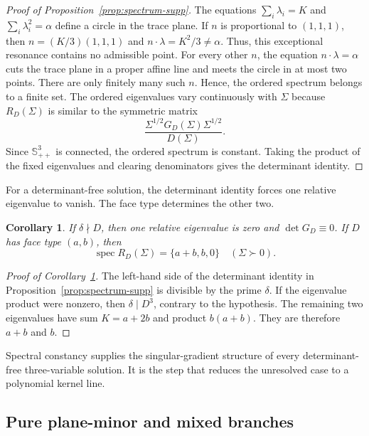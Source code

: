\documentclass[12pt,a4paper]{article}
\theoremstyle{plain}
\newtheorem{corollary}{Corollary}
\theoremstyle{definition}
\newcommand{\Smat}{\mathbb{S}}
\newcommand{\spec}{\operatorname{spec}}
\begin{document}
\begin{proof}[Proof of Proposition~\ref{prop:spectrum-supp}]
    The equations $\sum_i\lambda_i=K$ and $\sum_i\lambda_i^2=\alpha$ define a circle in the trace plane.
    If $n$ is proportional to $(1,1,1)$, then $n=(K/3)(1,1,1)$ and $n\cdot\lambda=K^2/3\ne\alpha$.
    Thus, this exceptional resonance contains no admissible point.
    For every other $n$, the equation $n\cdot\lambda=\alpha$ cuts the trace plane in a proper affine line and meets the circle in at most two points.
    There are only finitely many such $n$.
    Hence, the ordered spectrum belongs to a finite set.
    The ordered eigenvalues vary continuously with $\Sigma$ because $R_D(\Sigma)$ is similar to the symmetric matrix
    \begin{equation*}
        \frac{\Sigma^{1/2}G_D(\Sigma)\Sigma^{1/2}}{D(\Sigma)}
        .
    \end{equation*}
    Since $\Smat^3_{++}$ is connected, the ordered spectrum is constant.
    Taking the product of the fixed eigenvalues and clearing denominators gives the determinant identity.
\end{proof}

For a determinant-free solution, the determinant identity forces one relative eigenvalue to vanish.
The face type determines the other two.

\begin{corollary}
\label{cor:detG-supp}
    If $\delta\nmid D$, then one relative eigenvalue is zero and $\det G_D\equiv0$.
    If $D$ has face type $(a,b)$, then
    \begin{equation*}
        \spec R_D(\Sigma)=\{a+b,b,0\}
        \quad
        (\Sigma\succ0)
        .
    \end{equation*}
\end{corollary}

\begin{proof}[Proof of Corollary~\ref{cor:detG-supp}]
    The left-hand side of the determinant identity in Proposition~\ref{prop:spectrum-supp} is divisible by the prime $\delta$.
    If the eigenvalue product were nonzero, then $\delta\mid D^3$, contrary to the hypothesis.
    The remaining two eigenvalues have sum $K=a+2b$ and product $b(a+b)$.
    They are therefore $a+b$ and $b$.
\end{proof}

Spectral constancy supplies the singular-gradient structure of every determinant-free three-variable solution.
It is the step that reduces the unresolved case to a polynomial kernel line.

\subsection{Pure plane-minor and mixed branches}
\label{supp:d3-mixed-branches}
\end{document}
